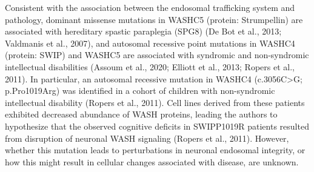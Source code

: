 Consistent with the association between the endosomal trafficking system and
pathology, dominant missense mutations in WASHC5 (protein: Strumpellin) are
associated with hereditary spastic paraplegia (SPG8) (De Bot et al., 2013;
Valdmanis et al., 2007), and autosomal recessive point mutations in WASHC4
(protein: SWIP) and WASHC5 are associated with syndromic and non-syndromic
intellectual disabilities (Assoum et al., 2020; Elliott et al., 2013; Ropers et
al., 2011). In particular, an autosomal recessive mutation in WASHC4 (c.3056C>G;
p.Pro1019Arg) was identified in a cohort of children with non-syndromic
intellectual disability (Ropers et al., 2011). Cell lines derived from these
patients exhibited decreased abundance of WASH proteins, leading the authors to
hypothesize that the observed cognitive deficits in SWIPP1019R patients resulted
from disruption of neuronal WASH signaling (Ropers et al., 2011). However,
whether this mutation leads to perturbations in neuronal endosomal integrity, or
how this might result in cellular changes associated with disease, are unknown.
